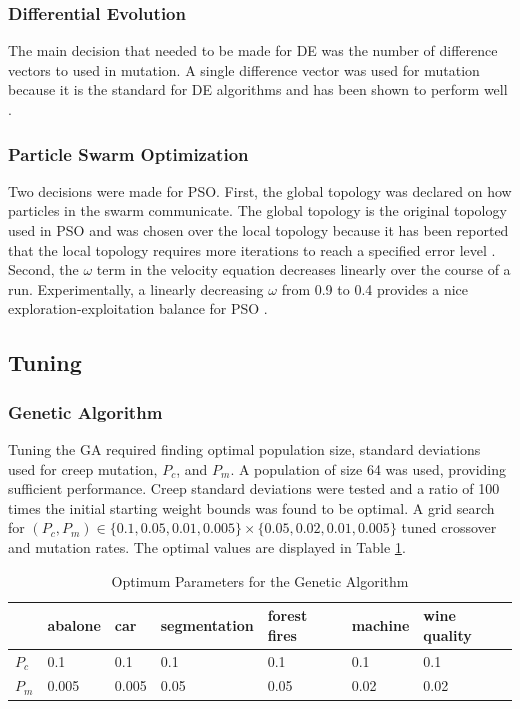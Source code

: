 \documentclass[twoside,11pt]{article}
\begin{document}
\subsubsection{Differential Evolution}
	The main decision that needed to be made for DE was the number of difference vectors to used in mutation. A single difference vector was used for mutation because it is the standard for DE algorithms and has been shown to perform well \cite{gamperle2002parameter}.

\subsubsection{Particle Swarm Optimization}

	Two decisions were made for PSO. First, the global topology was declared on how particles in the swarm communicate.
	The global topology is the original topology used in PSO and was chosen over the local topology because it has been reported that the local topology requires more iterations to reach a specified error level \citep{og-pso}.
	Second, the $\omega$ term in the velocity equation decreases linearly over the course of a run. Experimentally, a linearly decreasing $\omega$ from 0.9 to 0.4 provides a nice exploration-exploitation balance for PSO \citep{inertia}.

\subsection{Tuning}

\subsubsection{Genetic Algorithm}

	Tuning the GA required finding optimal population size, standard deviations used for creep mutation, $P_c$, and $P_m$. A population of size 64 was used, providing sufficient performance. Creep standard deviations were tested and a ratio of 100 times the initial starting weight bounds was found to be optimal. A grid search for $(P_c, P_m) \in \{0.1, 0.05, 0.01, 0.005\} \times \{0.05, 0.02, 0.01, 0.005\}$ tuned crossover and mutation rates. The optimal values are displayed in Table \ref{ga-tuning-table}.

	\begin{table}[h]
		\centering
		\begin{tabular}{|l|l|l|l|l|l|l|}
			\hline
			       & abalone & car & segmentation & forest fires & machine & wine quality  \\ \hline
			$P_c$  &     0.1 & 0.1 &          0.1 &          0.1 &     0.1 &          0.1  \\ \hline
			$P_m$  &   0.005 & 0.005 &       0.05 &         0.05 &    0.02 &         0.02  \\ \hline
		\end{tabular}
		\caption{Optimum Parameters for the Genetic Algorithm}
		\label{ga-tuning-table}
	\end{table}
\end{document}
